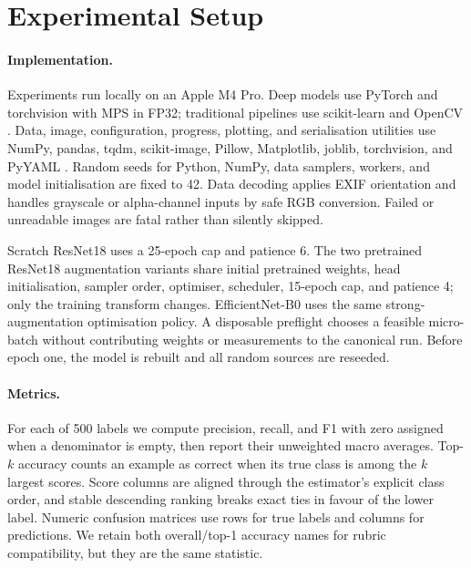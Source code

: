 \section{Experimental Setup}
\label{sec:setup}

\paragraph{Implementation.}
Experiments run locally on an Apple M4 Pro.  Deep models use PyTorch and
torchvision \cite{paszke2019pytorch} with MPS in FP32; traditional pipelines
use scikit-learn \cite{pedregosa2011scikit} and OpenCV
\cite{bradski2000opencv}.  Data, image, configuration, progress, plotting, and
serialisation utilities use NumPy, pandas, tqdm, scikit-image, Pillow,
Matplotlib, joblib, torchvision, and PyYAML
\cite{harris2020array,mckinney2010data,costaluis2019tqdm,vanderwalt2014scikitimage,
clark2026pillow,hunter2007matplotlib,joblib2025,marcel2010torchvision,pyyaml2025}.
Random seeds for Python, NumPy, data samplers,
workers, and model initialisation are fixed to 42.  Data decoding applies EXIF
orientation and handles grayscale or alpha-channel inputs by safe RGB
conversion.  Failed or unreadable images are fatal rather than silently
skipped.

Scratch ResNet18 uses a 25-epoch cap and patience 6.  The two pretrained
ResNet18 augmentation variants share initial pretrained weights, head
initialisation, sampler order, optimiser, scheduler, 15-epoch cap, and
patience 4; only the training transform changes.  EfficientNet-B0 uses the
same strong-augmentation optimisation policy.  A disposable preflight chooses
a feasible micro-batch without contributing weights or measurements to the
canonical run.  Before epoch one, the model is rebuilt and all random sources
are reseeded.

\paragraph{Metrics.}
For each of 500 labels we compute precision, recall, and F1 with zero assigned
when a denominator is empty, then report their unweighted macro averages.
Top-$k$ accuracy counts an example as correct when its true class is among the
$k$ largest scores.  Score columns are aligned through the estimator's
explicit class order, and stable descending ranking breaks exact ties in favour
of the lower label.  Numeric confusion matrices use rows for true labels and
columns for predictions.  We retain both overall/top-1 accuracy names for
rubric compatibility, but they are the same statistic.

